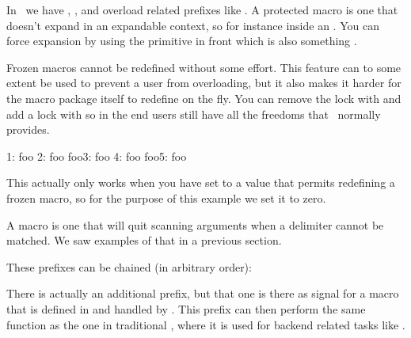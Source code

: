 In \LUAMETATEX\ we have \type {\global}, \type {\protected}, \type {\tolerant}
and overload related prefixes like \type {\frozen}. A protected macro is one that
doesn't expand in an expandable context, so for instance inside an \type {\edef}.
You can force expansion by using the \type {\expand} primitive in front which is
also something \LUAMETATEX.

%
%
%

Frozen macros cannot be redefined without some effort. This feature can to some
extent be used to prevent a user from overloading, but it also makes it harder
for the macro package itself to redefine on the fly. You can remove the lock with
\typ {\unletfrozen} and add a lock with  so in the end users
still have all the freedoms that \TEX\ normally provides.

\startbuffer[example]
                  1: \meaning\foo
          \frozen\def\foo{foo} 2: \meaning\foo
     \unletfrozen    \foo      3: \meaning\foo
\protected\frozen\def\foo{foo} 4: \meaning\foo
     \unletfrozen    \foo      5: \meaning\foo
\stopbuffer

\typebuffer[example][option=TEX]

\startlines {} \getbuffer[example] \stoplines

This actually only works when you have set \type {\overloadmode} to a value that
permits redefining a frozen macro, so for the purpose of this example we set it
to zero.

A \type {\tolerant} macro is one that will quit scanning arguments when a
delimiter cannot be matched. We saw examples of that in a previous section.

These prefixes can be chained (in arbitrary order):

\starttyping[option=TEX]
\frozen\tolerant\protected\global\def\foo[#1]#*[#2]{...}
\stoptyping

There is actually an additional prefix, \type {\immediate} but that one is there
as signal for a macro that is defined in and handled by \LUA. This prefix can
then perform the same function as the one in traditional \TEX, where it is used
for backend related tasks like \type {\write}.

